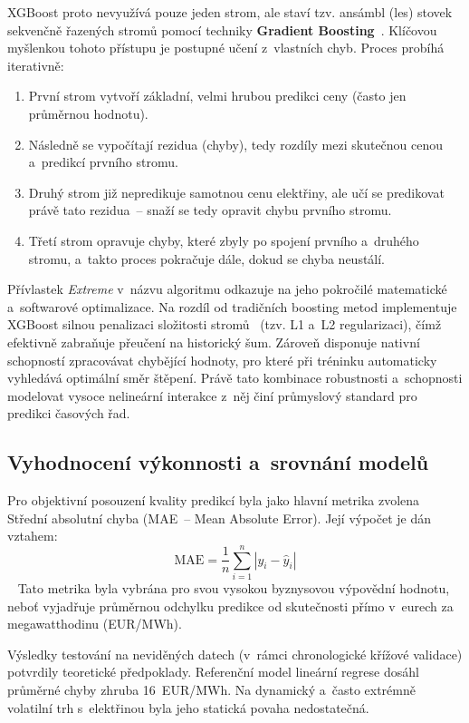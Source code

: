 \documentclass[a4paper]{article}
\begin{document}
XGBoost proto nevyužívá pouze jeden strom, ale staví tzv. ansámbl (les) stovek sekvenčně řazených stromů pomocí techniky \textbf{Gradient Boosting}~\cite{hands-on-ml}. Klíčovou myšlenkou tohoto přístupu je postupné učení z~vlastních chyb. 
Proces probíhá iterativně:
\begin{enumerate}
    \item První strom vytvoří základní, velmi hrubou predikci ceny (často jen průměrnou hodnotu).
    \item Následně se vypočítají rezidua (chyby), tedy rozdíly mezi skutečnou cenou a~predikcí prvního stromu.
    \item Druhý strom již nepredikuje samotnou cenu elektřiny, ale učí se predikovat právě tato rezidua~-- snaží se tedy opravit chybu prvního stromu.
    \item Třetí strom opravuje chyby, které zbyly po spojení prvního a~druhého stromu, a~takto proces pokračuje dále, dokud se chyba neustálí.
\end{enumerate}

Přívlastek \textit{Extreme} v~názvu algoritmu odkazuje na jeho pokročilé matematické a~softwarové optimalizace. Na rozdíl od tradičních boosting metod implementuje XGBoost silnou penalizaci složitosti stromů~\cite{xgboost} (tzv. L1 a~L2 regularizaci), čímž efektivně zabraňuje přeučení na historický šum. Zároveň disponuje nativní schopností zpracovávat chybějící hodnoty, pro které při tréninku automaticky vyhledává optimální směr štěpení. Právě tato kombinace robustnosti a~schopnosti modelovat vysoce nelineární interakce z~něj činí průmyslový standard pro predikci časových řad.

\subsection{Vyhodnocení výkonnosti a~srovnání modelů}
Pro objektivní posouzení kvality predikcí byla jako hlavní metrika zvolena Střední absolutní chyba (MAE~-- Mean Absolute Error). Její výpočet je dán vztahem:
$$ \text{MAE} = \frac{1}{n} \sum_{i=1}^{n} |y_i - \hat{y}_i| $$~\cite{hands-on-ml}
Tato metrika byla vybrána pro svou vysokou byznysovou výpovědní hodnotu, neboť vyjadřuje průměrnou odchylku predikce od skutečnosti přímo v~eurech za megawatthodinu (EUR/MWh).

Výsledky testování na neviděných datech (v~rámci chronologické křížové validace) potvrdily teoretické předpoklady. Referenční model lineární regrese dosáhl průměrné chyby zhruba 16~EUR/MWh. Na dynamický a~často extrémně volatilní trh s~elektřinou byla jeho statická povaha nedostatečná.
\end{document}
